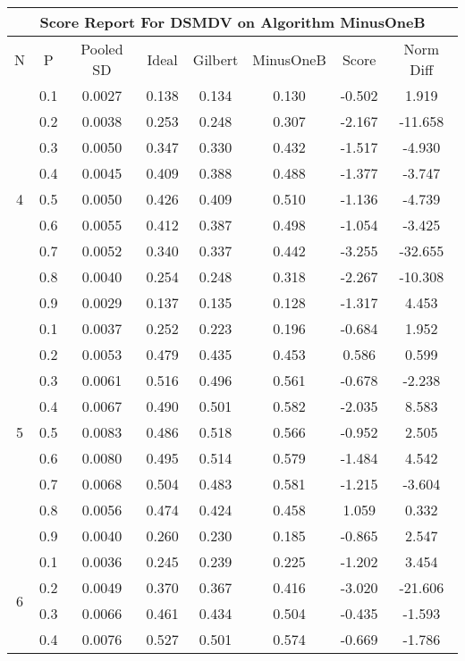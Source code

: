 \documentclass[11pt,a4paper]{report}
\begin{document}
\begin{longtable}{ | c | c || c | c | c | c | c | c | }
\hline
\multicolumn{8}{|c|}{ Score Report For DSMDV on Algorithm MinusOneB} \\
\hline
N & P & Pooled SD &  Ideal &  Gilbert & MinusOneB  & Score & Norm Diff \\
 \hline
 \hline
 \endhead
\multirow{9}{*}{4} & 0.1 & 0.0027 & 0.138 & 0.134 & 0.130 & -0.502 & 1.919 \\
 & 0.2 & 0.0038 & 0.253 & 0.248 & 0.307 & -2.167 & -11.658 \\
 & 0.3 & 0.0050 & 0.347 & 0.330 & 0.432 & -1.517 & -4.930 \\
 & 0.4 & 0.0045 & 0.409 & 0.388 & 0.488 & -1.377 & -3.747 \\
 & 0.5 & 0.0050 & 0.426 & 0.409 & 0.510 & -1.136 & -4.739 \\
 & 0.6 & 0.0055 & 0.412 & 0.387 & 0.498 & -1.054 & -3.425 \\
 & 0.7 & 0.0052 & 0.340 & 0.337 & 0.442 & -3.255 & -32.655 \\
 & 0.8 & 0.0040 & 0.254 & 0.248 & 0.318 & -2.267 & -10.308 \\
 & 0.9 & 0.0029 & 0.137 & 0.135 & 0.128 & -1.317 & 4.453 \\
 \hline
\multirow{9}{*}{5} & 0.1 & 0.0037 & 0.252 & 0.223 & 0.196 & -0.684 & 1.952 \\
 & 0.2 & 0.0053 & 0.479 & 0.435 & 0.453 & 0.586 & 0.599 \\
 & 0.3 & 0.0061 & 0.516 & 0.496 & 0.561 & -0.678 & -2.238 \\
 & 0.4 & 0.0067 & 0.490 & 0.501 & 0.582 & -2.035 & 8.583 \\
 & 0.5 & 0.0083 & 0.486 & 0.518 & 0.566 & -0.952 & 2.505 \\
 & 0.6 & 0.0080 & 0.495 & 0.514 & 0.579 & -1.484 & 4.542 \\
 & 0.7 & 0.0068 & 0.504 & 0.483 & 0.581 & -1.215 & -3.604 \\
 & 0.8 & 0.0056 & 0.474 & 0.424 & 0.458 & 1.059 & 0.332 \\
 & 0.9 & 0.0040 & 0.260 & 0.230 & 0.185 & -0.865 & 2.547 \\
 \hline
\multirow{9}{*}{6} & 0.1 & 0.0036 & 0.245 & 0.239 & 0.225 & -1.202 & 3.454 \\
 & 0.2 & 0.0049 & 0.370 & 0.367 & 0.416 & -3.020 & -21.606 \\
 & 0.3 & 0.0066 & 0.461 & 0.434 & 0.504 & -0.435 & -1.593 \\
 & 0.4 & 0.0076 & 0.527 & 0.501 & 0.574 & -0.669 & -1.786 \\

\end{longtable}
\end{document}
